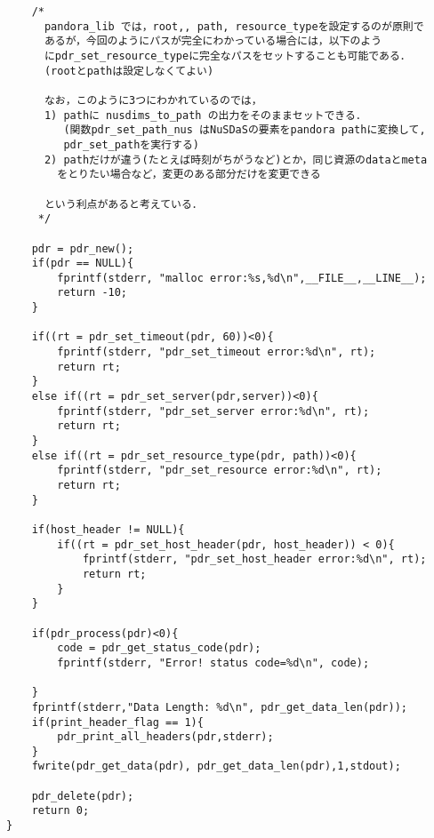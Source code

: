 \begin{verbatim}
    /*
      pandora_lib では，root,, path, resource_typeを設定するのが原則で
      あるが，今回のようにパスが完全にわかっている場合には，以下のよう
      にpdr_set_resource_typeに完全なパスをセットすることも可能である．
      (rootとpathは設定しなくてよい)

      なお，このように3つにわかれているのでは，
      1) pathに nusdims_to_path の出力をそのままセットできる．
         (関数pdr_set_path_nus はNuSDaSの要素をpandora pathに変換して,
         pdr_set_pathを実行する)
      2) pathだけが違う(たとえば時刻がちがうなど)とか，同じ資源のdataとmeta
        をとりたい場合など，変更のある部分だけを変更できる

      という利点があると考えている．
     */

    pdr = pdr_new();
    if(pdr == NULL){
        fprintf(stderr, "malloc error:%s,%d\n",__FILE__,__LINE__);
        return -10;
    }
    
    if((rt = pdr_set_timeout(pdr, 60))<0){
        fprintf(stderr, "pdr_set_timeout error:%d\n", rt);
        return rt;
    }
    else if((rt = pdr_set_server(pdr,server))<0){
        fprintf(stderr, "pdr_set_server error:%d\n", rt);
        return rt;
    }
    else if((rt = pdr_set_resource_type(pdr, path))<0){
        fprintf(stderr, "pdr_set_resource error:%d\n", rt);
        return rt;
    }

    if(host_header != NULL){
        if((rt = pdr_set_host_header(pdr, host_header)) < 0){
            fprintf(stderr, "pdr_set_host_header error:%d\n", rt);
            return rt;
        }
    }

    if(pdr_process(pdr)<0){
        code = pdr_get_status_code(pdr);
        fprintf(stderr, "Error! status code=%d\n", code);

    }
    fprintf(stderr,"Data Length: %d\n", pdr_get_data_len(pdr));
    if(print_header_flag == 1){
        pdr_print_all_headers(pdr,stderr);
    }
    fwrite(pdr_get_data(pdr), pdr_get_data_len(pdr),1,stdout);    

    pdr_delete(pdr);
    return 0;
}
\end{verbatim}
